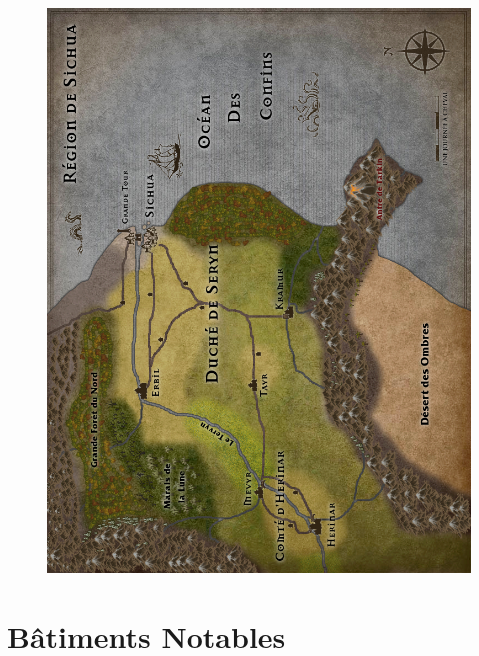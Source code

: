 \documentclass{dd}
\begin{document}
\begin{figure}[p]
\includegraphics[width=17.5cm]{Maps/RegionL.jpg}
\end{figure}



\chapter{Bâtiments Notables}







%

%
%

\end{document}
